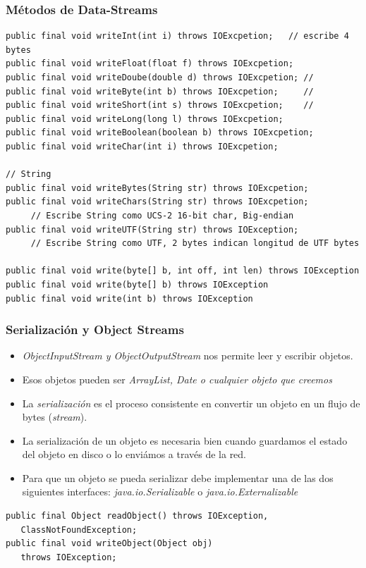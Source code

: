 \documentclass{beamer}
\begin{document}
\begin{frame}[fragile]
\frametitle{Métodos de Data-Streams}
\begin{tiny}
\begin{verbatim}
public final void writeInt(int i) throws IOExcpetion;   // escribe 4 bytes
public final void writeFloat(float f) throws IOExcpetion;
public final void writeDoube(double d) throws IOExcpetion; // 
public final void writeByte(int b) throws IOExcpetion;     // 
public final void writeShort(int s) throws IOExcpetion;    // 
public final void writeLong(long l) throws IOExcpetion;
public final void writeBoolean(boolean b) throws IOExcpetion;
public final void writeChar(int i) throws IOExcpetion;
 
// String
public final void writeBytes(String str) throws IOExcpetion;  
public final void writeChars(String str) throws IOExcpetion;
     // Escribe String como UCS-2 16-bit char, Big-endian 
public final void writeUTF(String str) throws IOException;   
     // Escribe String como UTF, 2 bytes indican longitud de UTF bytes 

public final void write(byte[] b, int off, int len) throws IOException
public final void write(byte[] b) throws IOException
public final void write(int b) throws IOException 
\end{verbatim}
\end{tiny}
\end{frame}

\begin{frame}[fragile]
\frametitle{Serialización y Object Streams}
\begin{itemize}[<+->]
\item \emph{ObjectInputStream y ObjectOutputStream} nos permite leer y escribir objetos.
\item Esos objetos pueden ser \emph{ArrayList, Date o cualquier objeto que creemos}
\item La \emph{serialización} es el proceso consistente en convertir un objeto en un flujo de bytes (\emph{stream}).
\item La serialización de un objeto es necesaria bien cuando guardamos el estado del objeto en disco o lo enviámos a través de la red.
\item Para que un objeto se pueda serializar debe implementar una de las dos siguientes interfaces: \emph{java.io.Serializable} o \emph{java.io.Externalizable}
\end{itemize}
\pause
\begin{verbatim}
public final Object readObject() throws IOException, 
   ClassNotFoundException;
public final void writeObject(Object obj) 
   throws IOException;
\end{verbatim}
\end{frame}
\end{document}
